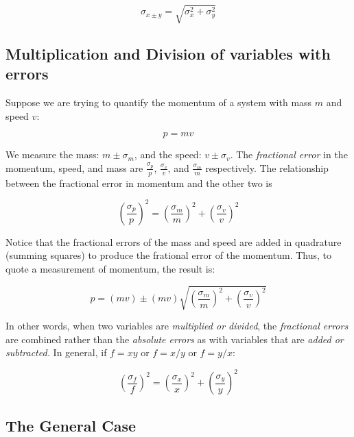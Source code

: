 \documentclass[12pt]{article}
\begin{document}
\begin{equation}
\sigma_{x\pm y} = \sqrt{\sigma_x^2 + \sigma_y^2}
\end{equation}

\subsection{Multiplication and Division of variables with errors}

Suppose we are trying to quantify the momentum of a system with mass $m$ and speed $v$:

\begin{equation}
p = mv
\end{equation}

We measure the mass: $m\pm \sigma_m$, and the speed: $v\pm\sigma_v$.  The \textit{fractional error} in the momentum, speed, and mass are $\frac{\sigma_p}{p}$, $\frac{\sigma_v}{v}$, and $\frac{\sigma_m}{m}$ respectively.  The relationship between the fractional error in momentum and the other two is

\begin{equation}
\left(\frac{\sigma_p}{p}\right)^2 = \left(\frac{\sigma_m}{m}\right)^2 + \left(\frac{\sigma_v}{v}\right)^2
\end{equation}

Notice that the fractional errors of the mass and speed are added in quadrature (summing squares) to produce the frational error of the momentum.  Thus, to quote a measurement of momentum, the result is:

\begin{equation}
p = (mv) \pm (mv) \sqrt{\left(\frac{\sigma_m}{m}\right)^2 + \left(\frac{\sigma_v}{v}\right)^2}
\end{equation}

In other words, when two variables are \textit{multiplied or divided}, the \textit{fractional errors} are combined rather than the \textit{absolute errors} as with variables that are \textit{added or subtracted.} In general, if $f=xy$ or $f = x/y$ or $f=y/x$:

\begin{equation}
\left(\frac{\sigma_f}{f}\right)^2 = \left(\frac{\sigma_x}{x}\right)^2 + \left(\frac{\sigma_y}{y}\right)^2 \label{eq:multi}
\end{equation}

\subsection{The General Case}
\end{document}
